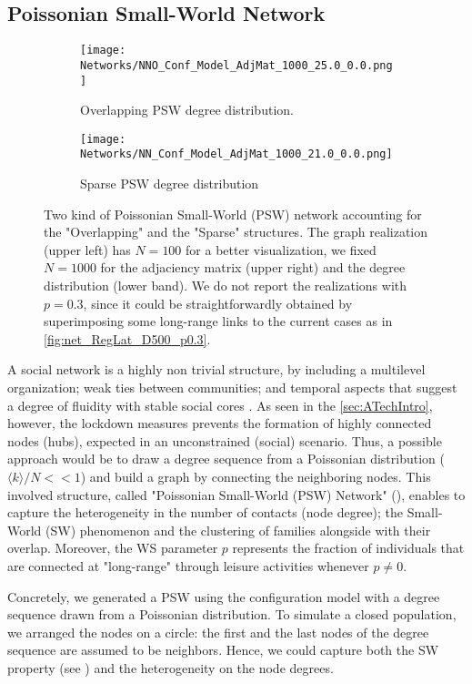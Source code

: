 \documentclass[a4paper,10pt, oneside]{book} %
\theoremstyle{definition}
\begin{document}
\clearpage
\subsection{Poissonian Small-World Network}
\label{sec:PSW_network}
\begin{figure}[ht]
    \begin{subfigure}{.45\linewidth}
        \texttt{[image: Networks/NNO\_Conf\_Model\_AdjMat\_1000\_25.0\_0.0.png]}
        \centering
        \caption{Overlapping PSW degree distribution. }
        \label{fig:netmod_O-PSW}
    \end{subfigure}
	\hfill
	\begin{subfigure}{.45\linewidth}
        \texttt{[image: Networks/NN\_Conf\_Model\_AdjMat\_1000\_21.0\_0.0.png]}
        \centering
        \caption{Sparse PSW degree distribution}
        \label{fig:netmod_S-PSW}
    \end{subfigure}
	\caption{Two kind of Poissonian Small-World (PSW) network accounting for the "Overlapping" and the "Sparse" structures. The graph realization (upper left) has $ N = 100$ for a better visualization, we fixed $ N = 1000$ for the adjaciency matrix (upper right) and the degree distribution (lower band). We do not report the realizations with $p = 0.3$, since it could be straightforwardly obtained by superimposing some long-range links to the current cases as in \autoref{fig:net_RegLat_D500_p0.3}.}
\end{figure}
A social network is a highly non trivial structure, by including a multilevel organization; weak ties between communities; and temporal aspects that suggest a degree of fluidity with stable social cores \cite{Thurner::NetBasedExpl}.
As seen in the \autoref{sec:ATechIntro}, however, the lockdown measures prevents the formation of highly connected nodes (hubs), expected in an unconstrained (social) scenario. Thus, a possible approach would be to draw a degree sequence from a Poissonian distribution ($\langle k \rangle / N <<1$) and build a graph by connecting the neighboring nodes.
This involved structure, called "Poissonian Small-World (PSW) Network" (\cite{Thurner::NetBasedExpl}), enables to capture the heterogeneity in the number of contacts (node degree); the Small-World (SW) phenomenon and the clustering of families alongside with their overlap. Moreover, the WS parameter $p$ represents the fraction of individuals that are connected at "long-range" through leisure activities whenever $ p \neq 0$. 

Concretely, we generated a PSW using the configuration model with a degree sequence drawn from a Poissonian distribution. To simulate a closed population, we arranged the nodes on a circle: the first and the last nodes of the degree sequence are assumed to be neighbors. Hence, we could capture both the SW property (see ) and the heterogeneity on the node degrees. 
\end{document}
